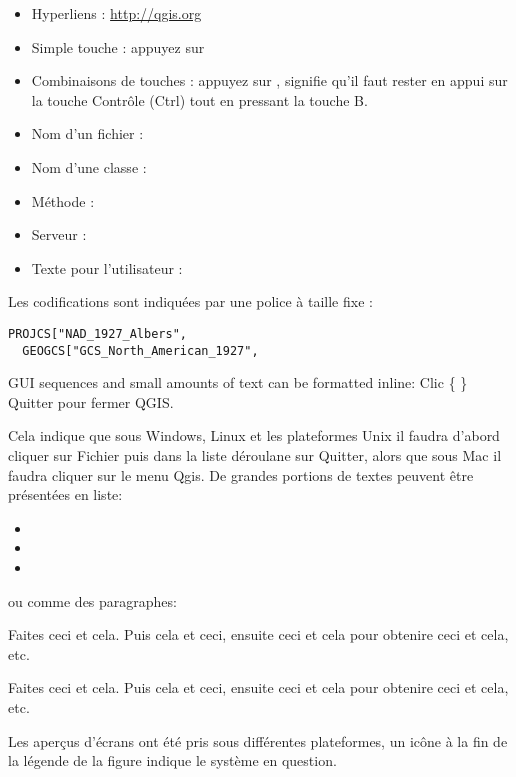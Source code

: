 \begin{itemize}[label=--]
\item Hyperliens : \url{http://qgis.org}
\item Simple touche : appuyez sur 
\item Combinaisons de touches : appuyez sur , signifie qu'il faut rester en appui sur la touche Contrôle (Ctrl) tout en pressant la touche B.
\item Nom d'un fichier : 
\item Nom d'une classe : 
\item Méthode : 
\item Serveur : 
\item Texte pour l'utilisateur : 
\end{itemize}

Les codifications sont indiquées par une police à taille fixe :
\begin{verbatim}
PROJCS["NAD_1927_Albers",
  GEOGCS["GCS_North_American_1927",
\end{verbatim}


GUI sequences and small amounts of text can be formatted inline: Clic
\{\nix{} \} \fleche Quitter pour fermer QGIS. 

Cela indique que sous Windows, Linux et les plateformes Unix il faudra d'abord cliquer sur Fichier puis dans la liste déroulane sur Quitter, alors que sous Mac il faudra cliquer sur le menu Qgis. De grandes portions de textes peuvent être présentées en liste:

\begin{itemize}[label=--]
\item {}
\item {}
\item {}
\end{itemize}

ou comme des paragraphes:

\nix{} \osx{} Faites ceci et cela. Puis cela et ceci, ensuite ceci et cela pour obtenire ceci et cela, etc. 

\win{}Faites ceci et cela. Puis cela et ceci, ensuite ceci et cela pour obtenire ceci et cela, etc. 

Les aperçus d'écrans ont été pris sous différentes plateformes, un icône à la fin de la légende de la figure indique le système en question.



